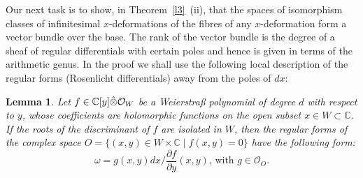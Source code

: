 \documentclass[11pt,twoside]{amsart}
\theoremstyle{plain}
\newtheorem{Lemma}[theorem]{Lemma}
\newcommand{\Sh}[1]{\mathcal{#1}} %
\newcommand{\dfx}{dx}
\begin{document}
Our next task is to show, in Theorem~\ref{l3}~(ii), that the spaces of isomorphism classes of infinitesimal $ x $-deformations of the fibres of any $x$-deformation form a vector bundle over the base. The rank of the vector bundle is the degree of a sheaf of regular differentials with certain poles and hence is given in terms of the arithmetic genus. In the proof we shall use the following local description of the regular forms (Rosenlicht differentials) away from the poles of $\dfx$:
\begin{Lemma}\label{l2}
Let $f\in\mathbb{C}[y]\Hat{\otimes}\Sh{O}_W$ be a Weierstra{\ss} polynomial of degree $d$ with respect to $y$, whose coefficients are holomorphic functions on the open subset $x\in W\subset\mathbb{C}$. If the roots of the discriminant of $f$ are isolated in $W$, then the regular forms of the complex space $O=\{(x,y)\in W\times\mathbb{C}\mid f(x,y)=0\}$ have the following form:
$$\omega=g(x,y)\dfx\big/\frac{\partial f}{\partial y}(x,y),\,
\text{with }g\in\Sh{O}_O.$$
\end{Lemma}
\end{document}
